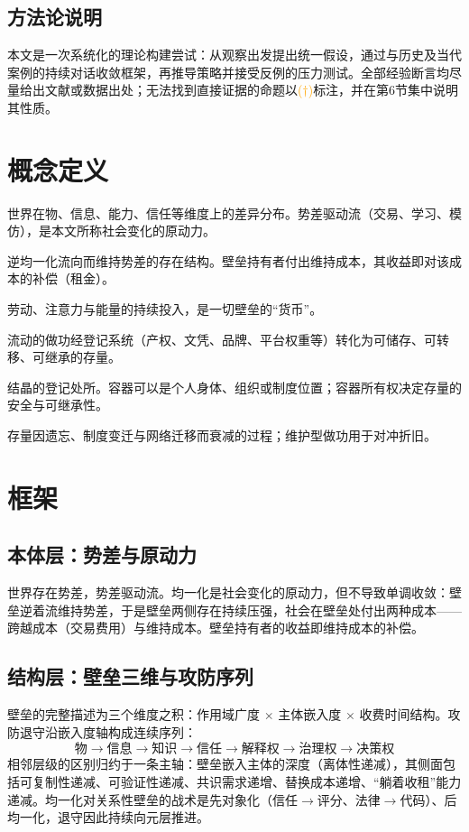 \documentclass[11pt]{ctexart}
\newcommand{\infmark}{\textcolor{orange}{(\(\dagger\))}}
\begin{document}
\subsection{方法论说明}
本文是一次系统化的理论构建尝试：从观察出发提出统一假设，通过与历史及当代案例的持续对话收敛框架，再推导策略并接受反例的压力测试。全部经验断言均尽量给出文献或数据出处；无法找到直接证据的命题以\infmark{}标注，并在第6节集中说明其性质。

\section{概念定义}
\begin{description}[leftmargin=2.2em]
\item[势差] 世界在物、信息、能力、信任等维度上的差异分布。势差驱动流（交易、学习、模仿），是本文所称社会变化的原动力。
\item[壁垒] 逆均一化流向而维持势差的存在结构。壁垒持有者付出维持成本，其收益即对该成本的补偿（租金）。
\item[做功] 劳动、注意力与能量的持续投入，是一切壁垒的“货币”。
\item[结晶] 流动的做功经登记系统（产权、文凭、品牌、平台权重等）转化为可储存、可转移、可继承的存量。
\item[容器] 结晶的登记处所。容器可以是个人身体、组织或制度位置；容器所有权决定存量的安全与可继承性。
\item[折旧] 存量因遗忘、制度变迁与网络迁移而衰减的过程；维护型做功用于对冲折旧。
\end{description}

\section{框架}
\subsection{本体层：势差与原动力}
世界存在势差，势差驱动流。均一化是社会变化的原动力，但不导致单调收敛：壁垒逆着流维持势差，于是壁垒两侧存在持续压强，社会在壁垒处付出两种成本——跨越成本（交易费用）与维持成本。壁垒持有者的收益即维持成本的补偿。

\subsection{结构层：壁垒三维与攻防序列}
壁垒的完整描述为三个维度之积：作用域广度 $\times$ 主体嵌入度 $\times$ 收费时间结构。攻防退守沿嵌入度轴构成连续序列：
\[
\text{物} \to \text{信息} \to \text{知识} \to \text{信任} \to \text{解释权} \to \text{治理权} \to \text{决策权}
\]
相邻层级的区别归约于一条主轴：壁垒嵌入主体的深度（离体性递减），其侧面包括可复制性递减、可验证性递减、共识需求递增、替换成本递增、“躺着收租”能力递减。均一化对关系性壁垒的战术是先对象化（信任$\to$评分、法律$\to$代码）、后均一化，退守因此持续向元层推进。
\end{document}
